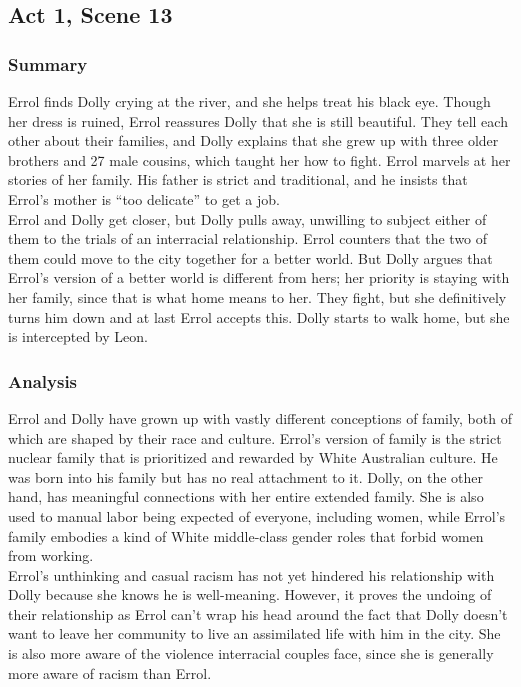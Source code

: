 \documentclass[a4paper]{article}
\begin{document}
\subsection{Act 1, Scene 13}
\subsubsection{Summary}
Errol finds Dolly crying at the river, and she helps treat his
black eye. Though her dress is ruined, Errol reassures Dolly
that she is still beautiful. They tell each other about their
families, and Dolly explains that she grew up with three older
brothers and 27 male cousins, which taught her how to fight.
Errol marvels at her stories of her family. His father is strict and
traditional, and he insists that Errol’s mother is “too delicate” to
get a job.\\

Errol and Dolly get closer, but Dolly pulls away, unwilling to
subject either of them to the trials of an interracial relationship.
Errol counters that the two of them could move to the city
together for a better world. But Dolly argues that Errol’s
version of a better world is different from hers; her priority is
staying with her family, since that is what home means to her.
They fight, but she definitively turns him down and at last Errol
accepts this. Dolly starts to walk home, but she is intercepted
by Leon.\\

\subsubsection{Analysis}
Errol and Dolly have grown up with vastly different conceptions of
family, both of which are shaped by their race and culture. Errol’s
version of family is the strict nuclear family that is prioritized and
rewarded by White Australian culture. He was born into his family
but has no real attachment to it. Dolly, on the other hand, has
meaningful connections with her entire extended family. She is also
used to manual labor being expected of everyone, including women,
while Errol’s family embodies a kind of White middle-class gender
roles that forbid women from working.\\

Errol’s unthinking and casual racism has not yet hindered his
relationship with Dolly because she knows he is well-meaning.
However, it proves the undoing of their relationship as Errol can’t
wrap his head around the fact that Dolly doesn’t want to leave her
community to live an assimilated life with him in the city. She is also
more aware of the violence interracial couples face, since she is
generally more aware of racism than Errol.\\
\end{document}
